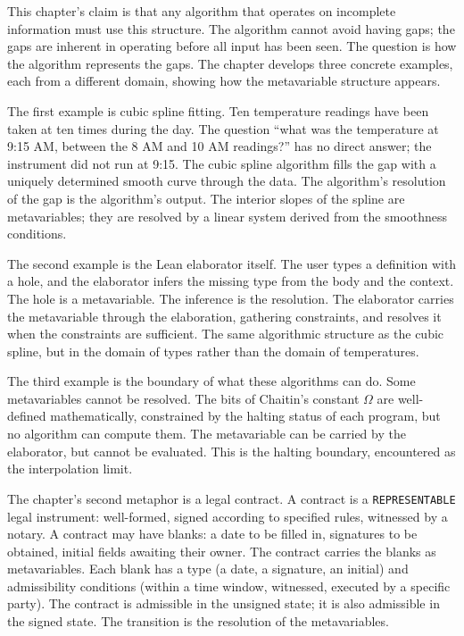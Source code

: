 \begin{chapteressay}
This chapter's claim is that any algorithm that operates on incomplete
information must use this structure. The algorithm cannot avoid having
gaps; the gaps are inherent in operating before all input has been
seen. The question is how the algorithm represents the gaps. The
chapter develops three concrete examples, each from a different domain,
showing how the metavariable structure appears.

The first example is cubic spline fitting. Ten temperature readings
have been taken at ten times during the day. The question ``what was
the temperature at 9:15 AM, between the 8 AM and 10 AM readings?'' has
no direct answer; the instrument did not run at 9:15. The cubic spline
algorithm fills the gap with a uniquely determined smooth curve through
the data. The algorithm's resolution of the gap is the algorithm's
output. The interior slopes of the spline are metavariables; they are
resolved by a linear system derived from the smoothness conditions.

The second example is the Lean elaborator itself. The user types a
definition with a hole, and the elaborator infers the missing type
from the body and the context. The hole is a metavariable. The
inference is the resolution. The elaborator carries the metavariable
through the elaboration, gathering constraints, and resolves it when
the constraints are sufficient. The same algorithmic structure as
the cubic spline, but in the domain of types rather than the domain
of temperatures.

The third example is the boundary of what these algorithms can do.
Some metavariables cannot be resolved. The bits of Chaitin's
constant $\Omega$ are well-defined mathematically, constrained by
the halting status of each program, but no algorithm can compute them.
The metavariable can be carried by the elaborator, but cannot be
evaluated. This is the halting boundary, encountered as the
interpolation limit.

The chapter's second metaphor is a legal contract. A contract is a
\texttt{REPRESENTABLE} legal instrument: well-formed, signed
according to specified rules, witnessed by a notary. A contract may
have blanks: a date to be filled in, signatures to be obtained,
initial fields awaiting their owner. The contract carries the blanks
as metavariables. Each blank has a type (a date, a signature, an
initial) and admissibility conditions (within a time window,
witnessed, executed by a specific party). The contract is
admissible in the unsigned state; it is also admissible in the
signed state. The transition is the resolution of the metavariables.


\end{chapteressay}
